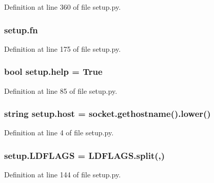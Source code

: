 Definition at line 360 of file setup.\+py.

\subsubsection[{\texorpdfstring{fn}{fn}}]{\setlength{\rightskip}{0pt plus 5cm}setup.\+fn}\hypertarget{namespacesetup_a501d41aa25b2969d3234702d4439c931}{}\label{namespacesetup_a501d41aa25b2969d3234702d4439c931}


Definition at line 175 of file setup.\+py.

\subsubsection[{\texorpdfstring{help}{help}}]{\setlength{\rightskip}{0pt plus 5cm}bool setup.\+help = True}\hypertarget{namespacesetup_a5dd2d263367c323cbd4d063b156a4a68}{}\label{namespacesetup_a5dd2d263367c323cbd4d063b156a4a68}


Definition at line 85 of file setup.\+py.

\subsubsection[{\texorpdfstring{host}{host}}]{\setlength{\rightskip}{0pt plus 5cm}string setup.\+host = socket.\+gethostname().lower()}\hypertarget{namespacesetup_a26e74581e39df55b9dbba8dcf7d485fe}{}\label{namespacesetup_a26e74581e39df55b9dbba8dcf7d485fe}


Definition at line 4 of file setup.\+py.

\subsubsection[{\texorpdfstring{L\+D\+F\+L\+A\+GS}{LDFLAGS}}]{\setlength{\rightskip}{0pt plus 5cm}setup.\+L\+D\+F\+L\+A\+GS = L\+D\+F\+L\+A\+G\+S.\+split(\textquotesingle{},\textquotesingle{})}\hypertarget{namespacesetup_ac2fa2127d48feb1a28f2aafa6fd00d0b}{}\label{namespacesetup_ac2fa2127d48feb1a28f2aafa6fd00d0b}


Definition at line 144 of file setup.\+py.

